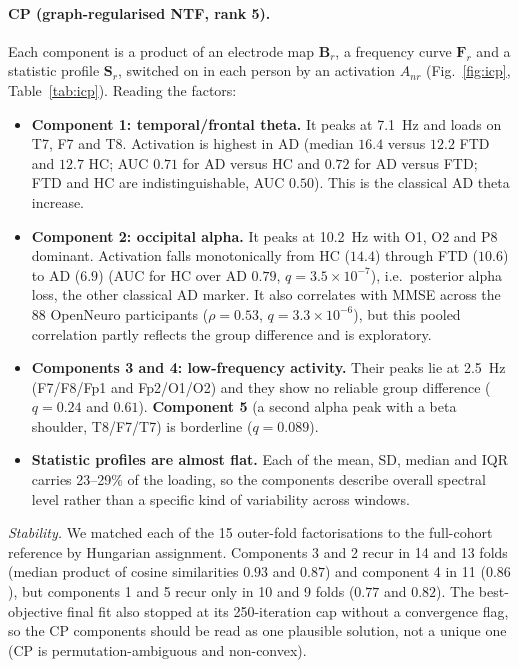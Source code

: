 \documentclass[10pt,twocolumn,a4paper]{article}
\begin{document}
\paragraph{CP (graph-regularised NTF, rank 5).}
Each component is a product of an electrode map $\mathbf B_r$, a frequency curve $\mathbf F_r$ and a statistic profile $\mathbf S_r$, switched on in each person by an activation $A_{nr}$ (Fig.~\ref{fig:icp}, Table~\ref{tab:icp}). Reading the factors:
\begin{itemize}
\item \textbf{Component 1: temporal/frontal theta.} It peaks at 7.1~Hz and loads on T7, F7 and T8. Activation is highest in AD (median $16.4$ versus $12.2$ FTD and $12.7$ HC; AUC $0.71$ for AD versus HC and $0.72$ for AD versus FTD; FTD and HC are indistinguishable, AUC $0.50$). This is the classical AD theta increase.
\item \textbf{Component 2: occipital alpha.} It peaks at 10.2~Hz with O1, O2 and P8 dominant. Activation falls monotonically from HC ($14.4$) through FTD ($10.6$) to AD ($6.9$) (AUC for HC over AD $0.79$, $q=3.5{\times}10^{-7}$), i.e.\ posterior alpha loss, the other classical AD marker. It also correlates with MMSE across the 88 OpenNeuro participants ($\rho=0.53$, $q=3.3{\times}10^{-6}$), but this pooled correlation partly reflects the group difference and is exploratory.
\item \textbf{Components 3 and 4: low-frequency activity.} Their peaks lie at 2.5~Hz (F7/F8/Fp1 and Fp2/O1/O2) and they show no reliable group difference ($q=0.24$ and $0.61$). \textbf{Component 5} (a second alpha peak with a beta shoulder, T8/F7/T7) is borderline ($q=0.089$).
\item \textbf{Statistic profiles are almost flat.} Each of the mean, SD, median and IQR carries 23--29\% of the loading, so the components describe overall spectral level rather than a specific kind of variability across windows.
\end{itemize}
\emph{Stability.} We matched each of the 15 outer-fold factorisations to the full-cohort reference by Hungarian assignment. Components 3 and 2 recur in 14 and 13 folds (median product of cosine similarities $0.93$ and $0.87$) and component 4 in 11 ($0.86$), but components 1 and 5 recur only in 10 and 9 folds ($0.77$ and $0.82$). The best-objective final fit also stopped at its 250-iteration cap without a convergence flag, so the CP components should be read as one plausible solution, not a unique one (CP is permutation-ambiguous and non-convex).
\end{document}

